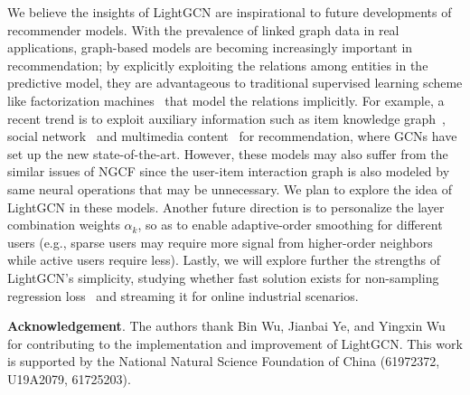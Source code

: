 \documentclass[sigconf]{acmart}
\theoremstyle{definition}
\begin{document}
We believe the insights of LightGCN are inspirational to future developments of recommender models. With the prevalence of linked graph data in real applications, graph-based models are becoming increasingly important in recommendation;
by explicitly exploiting the relations among entities in the predictive model, they are advantageous to traditional supervised learning scheme like factorization machines~\cite{FM,NFM} that model the relations implicitly. 
For example, a recent trend is to exploit auxiliary information such as item knowledge graph~\cite{KGAT}, social network~\cite{GCNSocial} and multimedia content~\cite{MMGCN} for recommendation, where GCNs have set up the new state-of-the-art. 
However, these models may also suffer from the similar issues of NGCF since the user-item interaction graph is also modeled by same neural operations that may be unnecessary. We plan to explore the idea of LightGCN in these models. Another future direction is to personalize the layer combination weights $\alpha_k$, so as to enable adaptive-order smoothing for different users (e.g., sparse users may require more signal from higher-order neighbors while active users require less). Lastly, we will explore further the strengths of LightGCN's simplicity, studying whether fast solution exists for non-sampling regression loss~\cite{he2019fast} and streaming it for online industrial scenarios. 

\noindent\textbf{Acknowledgement}. The authors thank Bin Wu, Jianbai Ye, and Yingxin Wu for contributing to the implementation and improvement of LightGCN. This work is supported by the National Natural Science Foundation of China (61972372, U19A2079, 61725203). 


\balance


\balance
\scriptsize
\end{document}
